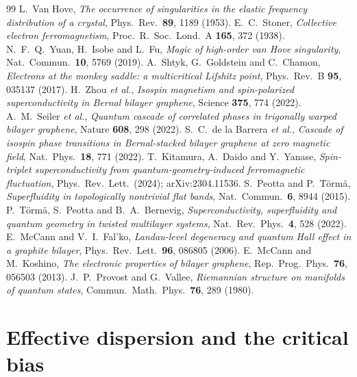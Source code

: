 \documentclass[aps,prb,twocolumn,superscriptaddress,floatfix,nofootinbib]{revtex4-2}
\begin{document}
\begin{thebibliography}{99}
 L.~Van Hove, \emph{The occurrence of singularities in the elastic frequency distribution of a crystal}, Phys.\ Rev.\ \textbf{89}, 1189 (1953).
 E.~C.~Stoner, \emph{Collective electron ferromagnetism}, Proc.\ R.\ Soc.\ Lond.\ A \textbf{165}, 372 (1938).
 N.~F.~Q.~Yuan, H.~Isobe and L.~Fu, \emph{Magic of high-order van Hove singularity}, Nat.\ Commun.\ \textbf{10}, 5769 (2019).
 A.~Shtyk, G.~Goldstein and C.~Chamon, \emph{Electrons at the monkey saddle: a multicritical Lifshitz point}, Phys.\ Rev.\ B \textbf{95}, 035137 (2017).
 H.~Zhou \emph{et al.}, \emph{Isospin magnetism and spin-polarized superconductivity in Bernal bilayer graphene}, Science \textbf{375}, 774 (2022).
 A.~M.~Seiler \emph{et al.}, \emph{Quantum cascade of correlated phases in trigonally warped bilayer graphene}, Nature \textbf{608}, 298 (2022).
 S.~C.~de la Barrera \emph{et al.}, \emph{Cascade of isospin phase transitions in Bernal-stacked bilayer graphene at zero magnetic field}, Nat.\ Phys.\ \textbf{18}, 771 (2022).
 T.~Kitamura, A.~Daido and Y.~Yanase, \emph{Spin-triplet superconductivity from quantum-geometry-induced ferromagnetic fluctuation}, Phys.\ Rev.\ Lett.\ (2024); arXiv:2304.11536.
 S.~Peotta and P.~T\"orm\"a, \emph{Superfluidity in topologically nontrivial flat bands}, Nat.\ Commun.\ \textbf{6}, 8944 (2015).
 P.~T\"orm\"a, S.~Peotta and B.~A.~Bernevig, \emph{Superconductivity, superfluidity and quantum geometry in twisted multilayer systems}, Nat.\ Rev.\ Phys.\ \textbf{4}, 528 (2022).
 E.~McCann and V.~I.~Fal'ko, \emph{Landau-level degeneracy and quantum Hall effect in a graphite bilayer}, Phys.\ Rev.\ Lett.\ \textbf{96}, 086805 (2006).
 E.~McCann and M.~Koshino, \emph{The electronic properties of bilayer graphene}, Rep.\ Prog.\ Phys.\ \textbf{76}, 056503 (2013).
 J.~P.~Provost and G.~Vallee, \emph{Riemannian structure on manifolds of quantum states}, Commun.\ Math.\ Phys.\ \textbf{76}, 289 (1980).
\end{thebibliography}

\clearpage
\appendix

\section{Effective dispersion and the critical bias}\label{app:dispersion}
\end{document}
